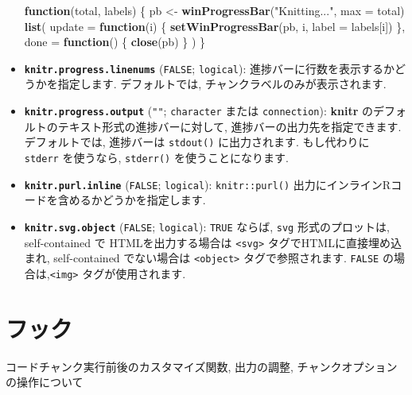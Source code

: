 \documentclass[
  lualatex,ja=standard,jafont=noto-otf]{bxjsreport}
\newenvironment{Shaded}{\begin{snugshade}}{\end{snugshade}}
\newcommand{\AttributeTok}[1]{\textcolor[rgb]{0.13,0.29,0.53}{#1}}
\newcommand{\ControlFlowTok}[1]{\textcolor[rgb]{0.13,0.29,0.53}{\textbf{#1}}}
\newcommand{\FunctionTok}[1]{\textcolor[rgb]{0.13,0.29,0.53}{\textbf{#1}}}
\newcommand{\NormalTok}[1]{#1}
\newcommand{\OtherTok}[1]{\textcolor[rgb]{0.56,0.35,0.01}{#1}}
\newcommand{\StringTok}[1]{\textcolor[rgb]{0.31,0.60,0.02}{#1}}
\begin{document}
\begin{itemize}
\begin{Shaded}
\begin{Highlighting}[numbers=left,,]
\ControlFlowTok{function}\NormalTok{(total, labels) \{}
\NormalTok{  pb }\OtherTok{\textless{}{-}} \FunctionTok{winProgressBar}\NormalTok{(}\StringTok{"Knitting..."}\NormalTok{, }\AttributeTok{max =}\NormalTok{ total)}
  \FunctionTok{list}\NormalTok{(}
    \AttributeTok{update =} \ControlFlowTok{function}\NormalTok{(i) \{}
      \FunctionTok{setWinProgressBar}\NormalTok{(pb, i, }\AttributeTok{label =}\NormalTok{ labels[i])}
\NormalTok{    \},}
    \AttributeTok{done =} \ControlFlowTok{function}\NormalTok{() \{}
      \FunctionTok{close}\NormalTok{(pb)}
\NormalTok{    \}}
\NormalTok{  )}
\NormalTok{\}}
\end{Highlighting}
\end{Shaded}
\item
  \textbf{\texttt{knitr.progress.linenums}} (\texttt{FALSE};
  \texttt{logical}): 進捗バーに行数を表示するかどうかを指定します.
  デフォルトでは, チャンクラベルのみが表示されます.
\item
  \textbf{\texttt{knitr.progress.output}} (\texttt{""};
  \texttt{character} または \texttt{connection}): \textbf{knitr}
  のデフォルトのテキスト形式の進捗バーに対して,
  進捗バーの出力先を指定できます. デフォルトでは, 進捗バーは
  \texttt{stdout()} に出力されます. もし代わりに \texttt{stderr}
  を使うなら, \texttt{stderr()} を使うことになります.
\item
  \textbf{\texttt{knitr.purl.inline}} (\texttt{FALSE};
  \texttt{logical}): \texttt{knitr::purl()}
  出力にインラインRコードを含めるかどうかを指定します.
\item
  \textbf{\texttt{knitr.svg.object}} (\texttt{FALSE}; \texttt{logical}):
  \texttt{TRUE} ならば, \texttt{svg} 形式のプロットは, self-contained で
  HTMLを出力する場合は \texttt{\textless{}svg\textgreater{}}
  タグでHTMLに直接埋め込まれ, self-contained でない場合は
  \texttt{\textless{}object\textgreater{}} タグで参照されます.
  \texttt{FALSE} の場合は,\texttt{\textless{}img\textgreater{}}
  タグが使用されます.
\end{itemize}

\hypertarget{hooks}{%
\chapter{フック}\label{hooks}}

コードチャンク実行前後のカスタマイズ関数, 出力の調整,
チャンクオプションの操作について
\end{document}
